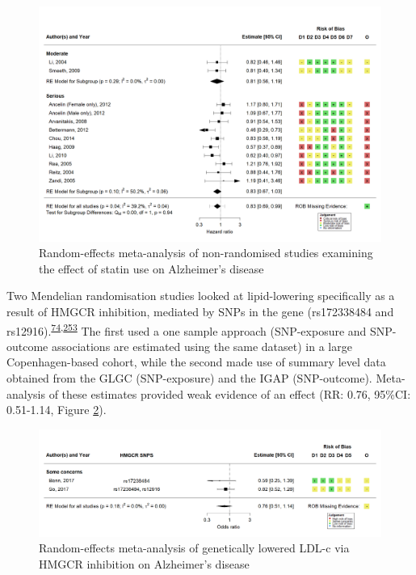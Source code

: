 \documentclass[a4paper, twoside]{templates/ociamthesis}
\begin{document}
\begin{figure}[H]
\includegraphics[width=1\linewidth]{figures/sys-rev/fp_obs_Statin-Ever_AD} \caption[Random-effects meta-analysis of statins on Alzheimer's disease]{Random-effects meta-analysis of non-randomised studies examining the effect of statin use on Alzheimer's disease}\label{fig:obsStatinADFig}
\end{figure}

Two Mendelian randomisation studies looked at lipid-lowering specifically as a result of HMGCR inhibition, mediated by SNPs in the gene (rs172338484 and rs12916).\textsuperscript{\protect\hyperlink{ref-benn2017}{74},\protect\hyperlink{ref-so2017}{253}} The first used a one sample approach (SNP-exposure and SNP-outcome associations are estimated using the same dataset) in a large Copenhagen-based cohort, while the second made use of summary level data obtained from the GLGC (SNP-exposure) and the IGAP (SNP-outcome). Meta-analysis of these estimates provided weak evidence of an effect (RR: 0.76, 95\%CI: 0.51-1.14, Figure \ref{fig:mrStatinADFig}).





\begin{figure}[H]
\includegraphics[width=1\linewidth]{figures/sys-rev/fp_MR_HMGCR_AD} \caption[Random-effects meta-analysis of genetically lowered LDL-c via HMGCR inhibition on Alzheimer's disease]{Random-effects meta-analysis of genetically lowered LDL-c via HMGCR inhibition on Alzheimer's disease}\label{fig:mrStatinADFig}
\end{figure}
\end{document}

